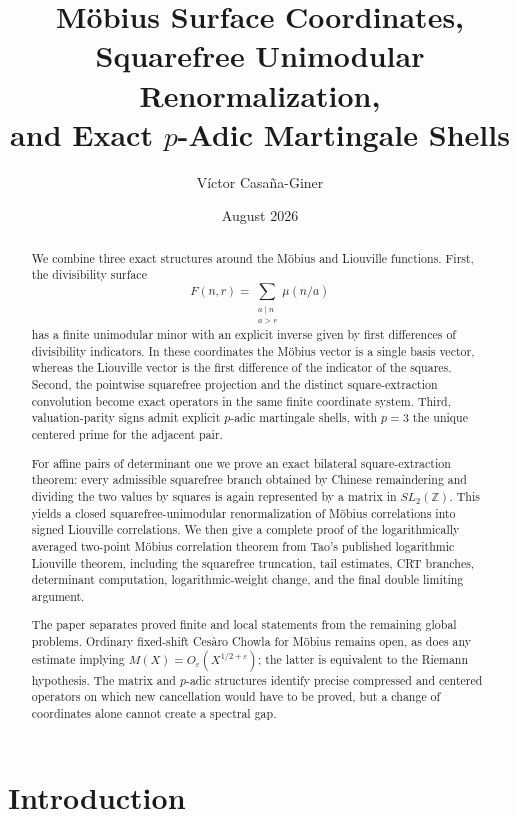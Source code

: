 \documentclass[11pt]{amsart}
\title{Möbius Surface Coordinates, Squarefree Unimodular Renormalization,\\and Exact $p$-Adic Martingale Shells}
\author{Víctor Casaña-Giner}
\date{August 2026}
\numberwithin{equation}{section}
\theoremstyle{plain}
\theoremstyle{definition}
\theoremstyle{remark}
\newcommand{\Z}{\mathbb Z}
\newcommand{\eps}{\varepsilon}
\newcommand{\mob}{\mu}
\newcommand{\Fsurf}{F}
\begin{document}
\pagestyle{plain}

\begin{abstract}
We combine three exact structures around the Möbius and Liouville functions.  First, the divisibility surface
\begin{equation}
\Fsurf(n,r)=\sum_{\substack{a\mid n\\a>r}}\mob(n/a)
\label{eq:abstract_surface}
\end{equation}
has a finite unimodular minor with an explicit inverse given by first differences of divisibility indicators.  In these coordinates the Möbius vector is a single basis vector, whereas the Liouville vector is the first difference of the indicator of the squares.  Second, the pointwise squarefree projection and the distinct square-extraction convolution become exact operators in the same finite coordinate system.  Third, valuation-parity signs admit explicit $p$-adic martingale shells, with $p=3$ the unique centered prime for the adjacent pair.

For affine pairs of determinant one we prove an exact bilateral square-extraction theorem: every admissible squarefree branch obtained by Chinese remaindering and dividing the two values by squares is again represented by a matrix in $SL_2(\Z)$.  This yields a closed squarefree-unimodular renormalization of Möbius correlations into signed Liouville correlations.  We then give a complete proof of the logarithmically averaged two-point Möbius correlation theorem from Tao's published logarithmic Liouville theorem, including the squarefree truncation, tail estimates, CRT branches, determinant computation, logarithmic-weight change, and the final double limiting argument.

The paper separates proved finite and local statements from the remaining global problems.  Ordinary fixed-shift Cesàro Chowla for Möbius remains open, as does any estimate implying
$M(X)=O_\eps(X^{1/2+\eps})$; the latter is equivalent to the Riemann hypothesis.  The matrix and $p$-adic structures identify precise compressed and centered operators on which new cancellation would have to be proved, but a change of coordinates alone cannot create a spectral gap.
\end{abstract}

\maketitle
\tableofcontents
\bigskip

\section{Introduction}
\label{sec:introduction}
\end{document}

